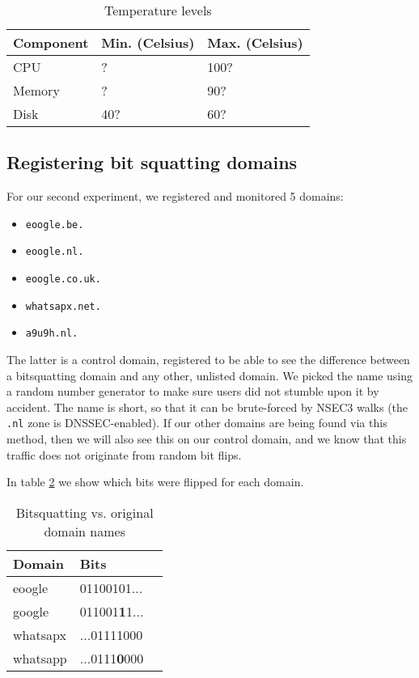 \documentclass[conference]{IEEEtran}
\begin{document}
\begin{table}[H]
  \centering
  \caption{Temperature levels}
  \label{table-temp}
  \begin{tabular}{|l|l|l|}
    \hline
    \textbf{Component}   & \textbf{Min. (Celsius)} & \textbf{Max. (Celsius)}\\ \hline
    CPU   & ? & 100? \\ \hline
    Memory & ? & 90? \\ \hline
    Disk & 40? & 60? \\ \hline
   \end{tabular}
\end{table}


\subsection{Registering bit squatting domains}

For our second experiment, we registered and monitored 5 domains:

\begin{itemize}
  \item \texttt{eoogle.be.}
  \item \texttt{eoogle.nl.}
  \item \texttt{eoogle.co.uk.}
  \item \texttt{whatsapx.net.}
  \item \texttt{a9u9h.nl.}
\end{itemize}

The latter is a control domain, registered to be able to see the difference
between a bitsquatting domain and any other, unlisted domain. We picked the
name using a random number generator to make sure users did not stumble upon it
by accident. The name is short, so that it can be brute-forced by NSEC3 walks
(the \texttt{.nl} zone is DNSSEC-enabled). If our other domains are being found
via this method, then we will also see this on our control domain, and we know
that this traffic does not originate from random bit flips.

In table \ref{tab:bits} we show which bits were flipped for each domain.

\begin{table}[H]
  \centering
  \caption{Bitsquatting vs. original domain names}
  \label{tab:bits}
  \begin{tabular}{|l|l|l|}
    \hline
    \textbf{Domain}   & \textbf{Bits} \\ \hline
    eoogle   & 01100101... \\ \hline
    google   & 011001\textbf{1}1... \\ \hline
    whatsapx & ...01111000 \\ \hline
    whatsapp & ...0111\textbf{0}000 \\ \hline
   \end{tabular}
\end{table}
\end{document}
